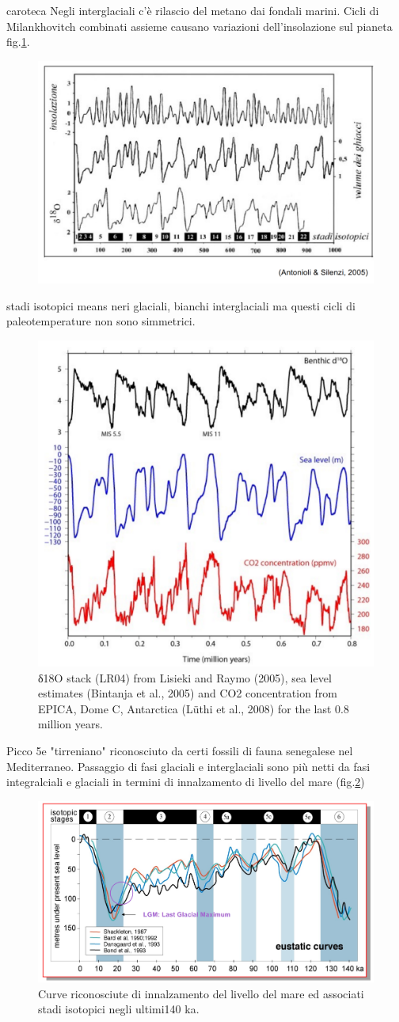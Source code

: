 caroteca
Negli interglaciali c'è rilascio del metano dai fondali marini. Cicli di Milankhovitch combinati assieme causano variazioni dell'insolazione sul pianeta fig.\ref{fig:insolazione}. 
\begin{figure}[htpb]
    \centering
    \includegraphics[width=0.5\linewidth]{uploads/insolazione.png}
    \label{fig:insolazione}
\end{figure}
stadi isotopici means neri glaciali, bianchi interglaciali ma questi cicli di paleotemperature non sono simmetrici. 
\begin{figure}[htpb]
    \centering
    \includegraphics[width=0.5\linewidth]{uploads/graph.png}
    \caption{δ18O stack (LR04) from Lisieki and Raymo (2005), sea level estimates (Bintanja et al., 2005) and CO2
concentration from EPICA, Dome C, Antarctica (Lüthi et al., 2008) for the last 0.8 million years.}
\end{figure}
Picco 5e "tirreniano" riconosciuto da certi fossili di fauna senegalese nel Mediterraneo. Passaggio di fasi glaciali e interglaciali sono più netti da fasi integralciali e glaciali in termini di innalzamento di livello del mare (fig.\ref{fig:livelli mare})
\begin{figure}[htpb]
    \centering
    \includegraphics[width=0.5\linewidth]{uploads/livelli.png}
    \caption{Curve riconosciute di innalzamento del livello del mare ed associati stadi isotopici negli ultimi140 ka.}
    \label{fig:livelli mare}
\end{figure}
